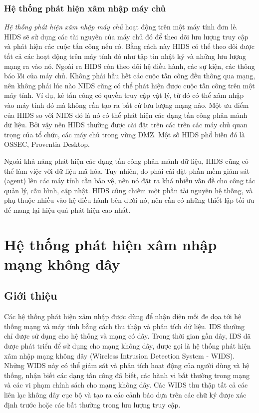 \subsubsection{Hệ thống phát hiện xâm nhập máy chủ}
\emph{Hệ thống phát hiện xâm nhập máy chủ} hoạt động trên một máy tính đơn lẻ. HIDS sẽ sử dụng các tài nguyên của máy chủ đó để theo dõi lưu lượng truy cập và phát hiện các cuộc tấn công nếu có. Bằng cách này HIDS có thể theo dõi được tất cả các hoạt động trên máy tính đó như tập tin nhật ký và những lưu lượng mạng ra vào nó. Ngoài ra HIDS còn theo dõi hệ điều hành, các sự kiện, các thông báo lỗi của máy chủ. Không phải hầu hết các cuộc tấn công đều thông qua mạng, nên không phải lúc nào NIDS cũng có thể phát hiện được cuộc tấn công trên một máy tính. Ví dụ, kẻ tấn công có quyền truy cập vật lý, từ đó có thể xâm nhập vào máy tính đó mà không cần tạo ra bất cứ lưu lượng mạng nào. Một ưu điểm của HIDS so với NIDS đó là nó có thể phát hiện các dạng tấn công phân mảnh dữ liệu. Bởi vậy nên HIDS thường được cài đặt trên các trên các máy chủ quan trọng của tổ chức, các máy chủ trong vùng DMZ. Một số HIDS phổ biến đó là OSSEC, Proventia Desktop.

Ngoài khả năng phát hiện các dạng tấn công phân mảnh dữ liệu, HIDS cũng có thể làm việc với dữ liệu mã hóa. Tuy nhiên, do phải cài đặt phần mềm giám sát (agent) lên các máy tính cần bảo vệ, nên nó đặt ra khá nhiều vấn đề cho công tác quản lý, cấu hình, cập nhật. HIDS cũng chiếm một phần tài nguyên hệ thống, và phụ thuộc nhiều vào hệ điều hành bên dưới nó, nên cần có những thiết lập tối ưu để mang lại hiệu quả phát hiện cao nhất.

\section{Hệ thống phát hiện xâm nhập mạng không dây}
\subsection{Giới thiệu}
Các hệ thống phát hiện xâm nhập được dùng để nhận diện mối đe dọa tới hệ thống mạng và máy tính bằng cách thu thập và phân tích dữ liệu. IDS thường chỉ được sử dụng cho hệ thống và mạng có dây. Trong thời gian gần đây, IDS đã được phát triển để sử dụng cho mạng không dây, được gọi là hệ thống phát hiện xâm nhập mạng không dây (Wireless Intrusion Detection System - WIDS). Những WIDS này có thể giám sát và phân tích hoạt động của người dùng và hệ thống, nhận biết các dạng tấn công đã biết, các hành vi bất thường trong mạng và các vi phạm chính sách cho mạng không dây. Các WIDS thu thập tất cả các liên lạc không dây cục bộ và tạo ra các cảnh báo dựa trên các chữ ký được xác định trước hoặc các bất thường trong lưu lượng truy cập.

